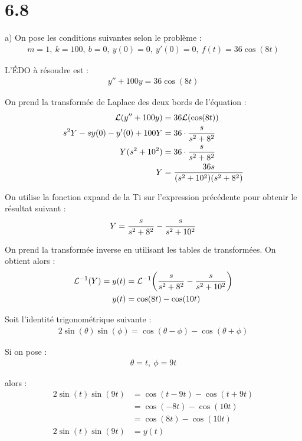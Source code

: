 \section*{6.8}

a) On pose les conditions suivantes selon le problème :
\begin{align*}
    m = 1,\ k=100,\ b = 0,\ y(0)=0,\ y'(0)=0,\ f(t) = 36\cos(8t)
\end{align*}

L'ÉDO à résoudre est :
\begin{align*}
    y''+100y=36\cos(8t)
\end{align*}

On prend la transformée de Laplace des deux bords de l'équation :
\begin{align*}
    \mathcal{L}{\left({y'' +100y}\right)} &= 36 \mathcal{L}{\left({\cos(8t)}\right)}\\
    s^2Y -sy(0)-y'(0)+100Y &= 36\cdot \dfrac{s}{s^2+8^2}\\
    Y(s^2+10^2) &= 36\cdot \dfrac{s}{s^2+8^2}\\
    Y &= \dfrac{36s}{(s^2+10^2)(s^2+8^2)}
\end{align*}

On utilise la fonction expand de la Ti sur l'expression précédente pour obtenir
le résultat suivant :
\begin{align*}
    Y = \dfrac{s}{s^2+8^2}- \dfrac{s}{s^2+10^2}
\end{align*}

On prend la transformée inverse en utilisant les tables de transformées. On
obtient alors :
\begin{align*}
    \mathcal{L}^{-1}{\left({Y}\right)} = y(t) &= \mathcal{L}^{-1}{\left({\dfrac{s}{s^2+8^2}-\dfrac{s}{s^2+10^2}}\right)}\\
    y(t) &= \cos(8t)-\cos(10t)
\end{align*}

Soit l'identité trigonométrique suivante :
\begin{align*}
    2\sin(\theta)\sin(\phi) = \cos(\theta - \phi)-\cos(\theta + \phi)
\end{align*}

Si on pose :
\begin{align*}
    \theta = t,\ \phi = 9t
\end{align*}

alors :
\begin{align*}
    2\sin(t)\sin(9t) &= \cos(t-9t)-\cos(t+9t)\\
    &= \cos(-8t)-\cos(10t)\\
    &= \cos(8t)-\cos(10t)\\
    2\sin(t)\sin(9t) &= y(t)
\end{align*}

